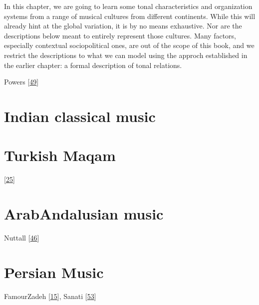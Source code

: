\documentclass[letterpaper,10pt,english]{sphinxmanual}
\begin{document}
\sphinxAtStartPar
In this chapter, we are going to learn some tonal characteristics and organization systems from a range of
musical cultures from different continents. While this will already hint at the global variation,
it is by no means exhaustive. Nor are the descriptions below meant to entirely represent those cultures.
Many factors, especially contextual sociopolitical ones, are out of the scope of this book, and we
restrict the descriptions to what we can model using the approch established in the earlier chapter:
a formal description of tonal relations.

\sphinxAtStartPar
Powers  {[}\hyperlink{cite.8_bibliography:id23}{49}{]}


\section{Indian classical music}
\label{\detokenize{2_scales_modes:indian-classical-music}}

\section{Turkish Maqam}
\label{\detokenize{2_scales_modes:turkish-maqam}}
\sphinxAtStartPar
{} {[}\hyperlink{cite.8_bibliography:id56}{25}{]}


\section{Arab\sphinxhyphen{}Andalusian music}
\label{\detokenize{2_scales_modes:arab-andalusian-music}}
\sphinxAtStartPar
Nuttall  {[}\hyperlink{cite.8_bibliography:id75}{46}{]}


\section{Persian Music}
\label{\detokenize{2_scales_modes:persian-music}}
\sphinxAtStartPar
FamourZadeh {[}\hyperlink{cite.8_bibliography:id73}{15}{]}, Sanati {[}\hyperlink{cite.8_bibliography:id69}{53}{]}
\end{document}
